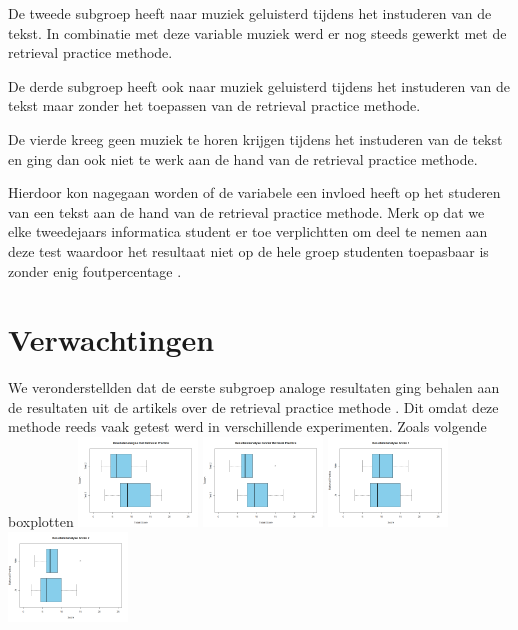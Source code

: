 \documentclass{hogent-article}
\begin{document}
	De tweede subgroep heeft naar muziek geluisterd tijdens het instuderen van de tekst. In combinatie met deze variable muziek werd er nog steeds gewerkt met de retrieval practice methode.
	
	De derde subgroep heeft ook naar muziek geluisterd tijdens het instuderen van de tekst maar zonder het toepassen van de retrieval practice methode.
	
	De vierde kreeg geen muziek te horen krijgen tijdens het instuderen van de tekst en ging dan ook niet te werk aan de hand van de retrieval practice methode.
	
	Hierdoor kon nagegaan worden of de variabele een invloed heeft op het studeren van een tekst aan de hand van de retrieval practice methode. Merk op dat we elke tweedejaars informatica student er toe verplichtten om deel te nemen aan deze test waardoor het resultaat niet op de hele groep studenten toepasbaar is zonder enig foutpercentage \autocite{karpicke2009metacognitive}.
	
	\section{Verwachtingen} %
	We veronderstellden dat de eerste subgroep analoge resultaten ging behalen aan de resultaten uit de artikels over de retrieval practice methode \autocite{butler2010repeated, pyc2012test, karpicke2007repeated, karpicke2008critical}. Dit omdat deze methode reeds vaak getest werd in verschillende experimenten. Zoals volgende boxplotten
	\includegraphics[width=120px]{Verwacht_RetrievalPractice}
	\includegraphics[width=120px]{Verwacht_ZonderRetrievalPractice}
	\includegraphics[width=120px]{Verwacht_RT_Score1}
	\includegraphics[width=120px]{Verwacht_RT_Score2}
	
\end{document}
